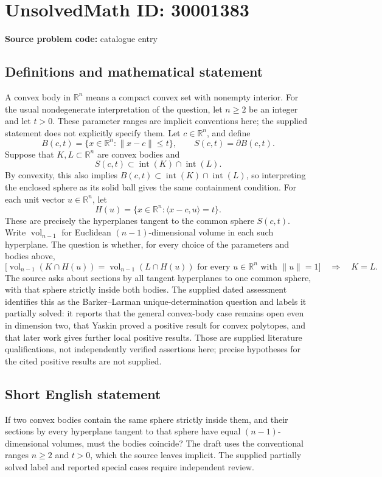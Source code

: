 \documentclass[11pt]{article}
\newcommand{\R}{\mathbb{R}}
\begin{document}
\section*{UnsolvedMath ID: 30001383}
\textbf{Source problem code:} catalogue entry
\subsection{Definitions and mathematical statement}
A convex body in \(\R^n\) means a compact convex set with nonempty interior. For the usual nondegenerate interpretation of the question, let \(n\geq 2\) be an integer and let \(t>0\). These parameter ranges are implicit conventions here; the supplied statement does not explicitly specify them. Let \(c\in\R^n\), and define
\[
B(c,t)=\{x\in\R^n:\|x-c\|\leq t\},\qquad S(c,t)=\partial B(c,t).
\]
Suppose that \(K,L\subset\R^n\) are convex bodies and
\[
S(c,t)\subset\operatorname{int}(K)\cap\operatorname{int}(L).
\]
By convexity, this also implies \(B(c,t)\subset\operatorname{int}(K)\cap\operatorname{int}(L)\), so interpreting the enclosed sphere as its solid ball gives the same containment condition. For each unit vector \(u\in\R^n\), let
\[
H(u)=\{x\in\R^n:\langle x-c,u\rangle=t\}.
\]
These are precisely the hyperplanes tangent to the common sphere \(S(c,t)\). Write \(\operatorname{vol}_{n-1}\) for Euclidean \((n-1)\)-dimensional volume in each such hyperplane. The question is whether, for every choice of the parameters and bodies above,
\[
\bigl[\operatorname{vol}_{n-1}(K\cap H(u))=\operatorname{vol}_{n-1}(L\cap H(u))\text{ for every }u\in\R^n\text{ with }\|u\|=1\bigr]
\quad\Longrightarrow\quad K=L.
\]
The source asks about sections by all tangent hyperplanes to one common sphere, with that sphere strictly inside both bodies. The supplied dated assessment identifies this as the Barker--Larman unique-determination question and labels it partially solved: it reports that the general convex-body case remains open even in dimension two, that Yaskin proved a positive result for convex polytopes, and that later work gives further local positive results. Those are supplied literature qualifications, not independently verified assertions here; precise hypotheses for the cited positive results are not supplied.
\subsection{Short English statement}
If two convex bodies contain the same sphere strictly inside them, and their sections by every hyperplane tangent to that sphere have equal \((n-1)\)-dimensional volumes, must the bodies coincide? The draft uses the conventional ranges \(n\geq2\) and \(t>0\), which the source leaves implicit. The supplied partially solved label and reported special cases require independent review.
\end{document}
